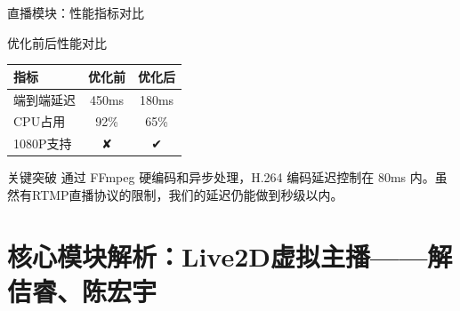 \documentclass{beamer}
\begin{document}
\begin{frame}{直播模块：性能指标对比}
    \begin{block}{优化前后性能对比}
        \centering
        \begin{tabular}{lcc}
            \toprule
            \textbf{指标} & \textbf{优化前} & \textbf{优化后} \\
            \midrule
            端到端延迟 & 450ms & \color{green!70!black}180ms \\
            CPU占用    & 92\%   & \color{green!70!black}65\% \\
            1080P支持  & ✘      & \color{green!70!black}✔ \\
            \bottomrule
        \end{tabular}
    \end{block}
    \begin{alertblock}{关键突破}
        通过 FFmpeg 硬编码和异步处理，H.264 编码延迟控制在 80ms 内。虽然有RTMP直播协议的限制，我们的延迟仍能做到秒级以内。
    \end{alertblock}
\end{frame}

\section{核心模块解析：Live2D虚拟主播——解佶睿、陈宏宇}
\end{document}
